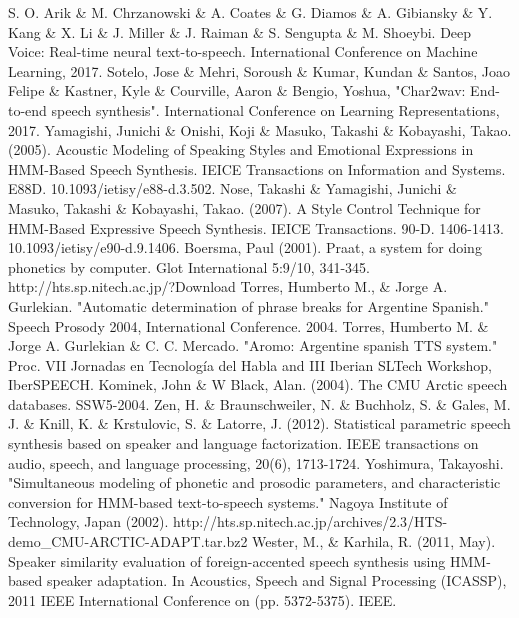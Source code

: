 \begin{thebibliography}{9}
 S. O. Arik \& M. Chrzanowski \& A. Coates \& G. Diamos \& A. Gibiansky \& Y. Kang \& X. Li \& J. Miller \& J. Raiman \& S. Sengupta \& M. Shoeybi. Deep Voice: Real-time neural text-to-speech. International Conference on Machine Learning, 2017.
 Sotelo, Jose \& Mehri, Soroush \& Kumar, Kundan \& Santos, Joao Felipe \& Kastner, Kyle \& Courville, Aaron \& Bengio, Yoshua, "Char2wav: End-to-end speech synthesis". International Conference on Learning Representations, 2017.
 Yamagishi, Junichi \& Onishi, Koji \& Masuko, Takashi \& Kobayashi, Takao. (2005). Acoustic Modeling of Speaking Styles and Emotional Expressions in HMM-Based Speech Synthesis. IEICE Transactions on Information and Systems. E88D. 10.1093/ietisy/e88-d.3.502. 
 Nose, Takashi \& Yamagishi, Junichi \& Masuko, Takashi \& Kobayashi, Takao. (2007). A Style Control Technique for HMM-Based Expressive Speech Synthesis. IEICE Transactions. 90-D. 1406-1413. 10.1093/ietisy/e90-d.9.1406. 
 Boersma, Paul (2001). Praat, a system for doing phonetics by computer. Glot International 5:9/10, 341-345.
 http://hts.sp.nitech.ac.jp/?Download
 Torres, Humberto M., \& Jorge A. Gurlekian. "Automatic determination of phrase breaks for Argentine Spanish." Speech Prosody 2004, International Conference. 2004.
 Torres, Humberto M. \& Jorge A. Gurlekian \& C. C. Mercado. "Aromo: Argentine spanish TTS system." Proc. VII Jornadas en Tecnología del Habla and III Iberian SLTech Workshop, IberSPEECH.
 Kominek, John \& W Black, Alan. (2004). The CMU Arctic speech databases. SSW5-2004.
 Zen, H. \& Braunschweiler, N. \& Buchholz, S. \& Gales, M. J. \& Knill, K.  \& Krstulovic, S. \& Latorre, J. (2012). Statistical parametric speech synthesis based on speaker and language factorization. IEEE transactions on audio, speech, and language processing, 20(6), 1713-1724.
 Yoshimura, Takayoshi. "Simultaneous modeling of phonetic and prosodic parameters, and characteristic conversion for HMM-based text-to-speech systems." Nagoya Institute of Technology, Japan (2002).
 http://hts.sp.nitech.ac.jp/archives/2.3/HTS-demo\_CMU-ARCTIC-ADAPT.tar.bz2
 Wester, M., \& Karhila, R. (2011, May). Speaker similarity evaluation of foreign-accented speech synthesis using HMM-based speaker adaptation. In Acoustics, Speech and Signal Processing (ICASSP), 2011 IEEE International Conference on (pp. 5372-5375). IEEE.

\end{thebibliography}
